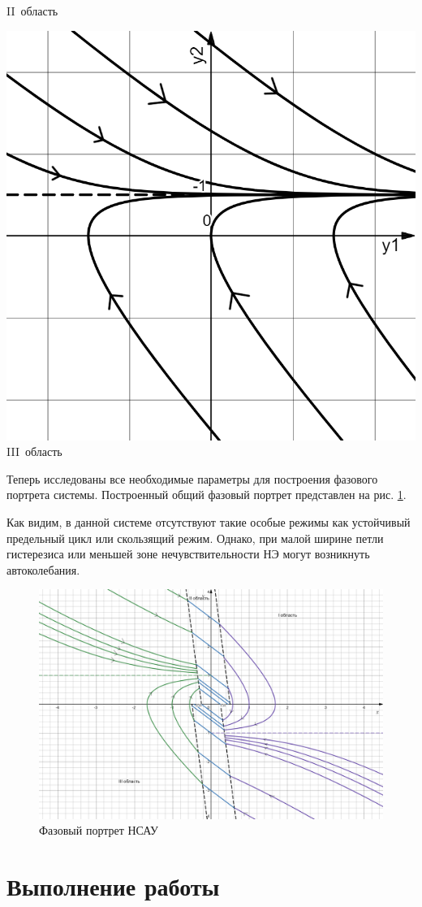 {\begin{minipage}{.333\textwidth}
		II~область
	\end{minipage}	
	\begin{minipage}{.333\textwidth}
		\centering\includegraphics[width=.95\textwidth]{png/зона3.png}
		III~область
	\end{minipage}

	\label{tr}
}

	Теперь исследованы все необходимые параметры для построения фазового портрета системы. Построенный общий фазовый портрет представлен на рис. \ref{FP}. 
	
	Как видим, в данной системе отсутствуют такие особые режимы как устойчивый предельный цикл или скользящий режим. Однако, при малой ширине петли гистерезиса или меньшей зоне нечувствительности НЭ могут возникнуть автоколебания.	
	
	\begin{figure}[h]
		\centering\includegraphics[width=.8\textwidth]{png/FP.png}
		\caption{Фазовый портрет НСАУ}
		\label{FP}
	\end{figure}

	\section{Выполнение работы}

	


